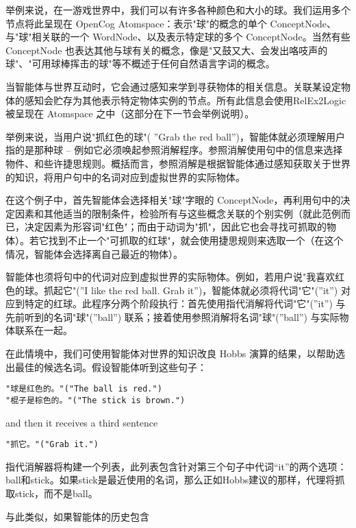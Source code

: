 举例来说，在一游戏世界中，我们可以有许多各种颜色和大小的球。我们运用多个节点将此呈现在 OpenCog Atomspace：表示"球"的概念的单个 ConceptNode、与"球"相关联的一个 WordNode、以及表示特定球的多个 ConceptNode。当然有些 ConceptNode 也表达其他与球有关的概念，像是"又鼓又大、会发出咯吱声的球"、"可用球棒挥击的球"等不概述于任何自然语言字词的概念。

当智能体与世界互动时，它会通过感知来学到寻获物体的相关信息。关联某设定物体的感知会贮存为其他表示特定物体实例的节点。所有此信息会使用RelEx2Logic 被呈现在 Atomspace 之中（这部分在下一节会举例说明）。

举例来说，当用户说"抓红色的球"( ”Grab the red ball”)，智能体就必须理解用户指的是那种球 – 例如它必须唤起参照消解程序。参照消解使用句中的信息来选择物件、和些许捷思规则。概括而言，参照消解是根据智能体通过感知获取关于世界的知识，将用户句中的名词对应到虚拟世界的实际物体。

在这个例子中，首先智能体会选择相关"球"字眼的 ConceptNode，再利用句中的决定因素和其他适当的限制条件，检验所有与这些概念关联的个别实例（就此范例而已，决定因素为形容词"红色"；而由于动词为"抓"，因此它也会寻找可抓取的物体）。若它找到不止一个"可抓取的红球"，就会使用捷思规则来选取一个（在这个情况，智能体会选择离自己最近的物体）。

智能体也须将句中的代词对应到虚拟世界的实际物体。例如，若用户说"我喜欢红色的球。抓起它"(”I like the red ball. Grab it”)，智能体就必须将代词"它"(”it”) 对应到特定的红球。此程序分两个阶段执行：首先使用指代消解将代词"它"(”it”) 与先前听到的名词"球"(”ball”) 联系；接着使用参照消解将名词"球"(”ball”) 与实际物体联系在一起。

在此情境中，我们可使用智能体对世界的知识改良 Hobbs 演算的结果，以帮助选出最佳的候选名词。假设智能体听到这些句子：


\begin{verbatim}
"球是红色的。"("The ball is red.")
"棍子是棕色的。"("The stick is brown.") 

\end{verbatim}

\noindent and then it receives a third sentence

\begin{verbatim}
"抓它。"("Grab it.")
\end{verbatim}

指代消解器将构建一个列表，此列表包含针对第三个句子中代词“it”的两个选项：ball和stick。如果stick是最近使用的名词，那么正如Hobbs建议的那样，代理将抓取stick，而不是ball。

与此类似，如果智能体的历史包含

